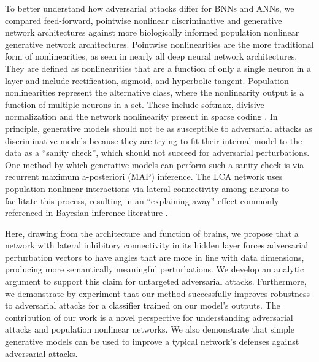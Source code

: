 To better understand how adversarial attacks differ for BNNs and ANNs, we compared feed-forward, pointwise nonlinear discriminative and generative network architectures against more biologically informed population nonlinear generative network architectures. Pointwise nonlinearities are the more traditional form of nonlinearities, as seen in nearly all deep neural network architectures. They are defined as nonlinearities that are a function of only a single neuron in a layer and include rectification, sigmoid, and hyperbolic tangent. Population nonlinearities represent the alternative class, where the nonlinearity output is a function of multiple neurons in a set. These include softmax, divisive normalization \parencite{carandini2012normalization, balle2016end} and the network nonlinearity present in sparse coding \parencite{rozell2008sparse, olshausen1997sparse}. In principle, generative models should not be as susceptible to adversarial attacks as discriminative models because they are trying to fit their internal model to the data as a ``sanity check'', which should not succeed for adversarial perturbations. One method by which generative models can perform such a sanity check is via recurrent maximum a-posteriori (MAP) inference. The LCA network uses population nonlinear interactions via lateral connectivity among neurons to facilitate this process, resulting in an ``explaining away'' effect commonly referenced in Bayesian inference literature \parencite{olshausen2013perception}.

Here, drawing from the architecture and function of brains, we propose that a network with lateral inhibitory connectivity in its hidden layer forces adversarial perturbation vectors to have angles that are more in line with data dimensions, producing more semantically meaningful perturbations. We develop an analytic argument to support this claim for untargeted adversarial attacks. Furthermore, we demonstrate by experiment that our method successfully improves robustness to adversarial attacks for a classifier trained on our model's outputs. The contribution of our work is a novel perspective for understanding adversarial attacks and population nonlinear networks. We also demonstrate that simple generative models can be used to improve a typical network’s defenses against adversarial attacks.

